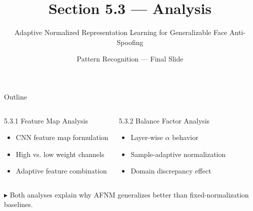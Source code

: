 \documentclass[aspectratio=169,10pt]{beamer}
\author{Pattern Recognition — Final Slide}
\institute{University of Science, VNU HCMC}
\title{Section 5.3 — Analysis}
\subtitle{Adaptive Normalized Representation Learning for Generalizable Face Anti-Spoofing}
\date{}
\newcommand{\pos}[1]{\textcolor{positive}{#1}}
\newcommand{\HL}[1]{\textcolor{emphasis}{#1}}
\begin{document}
\begin{frame}
  \titlepage
\end{frame}

\begin{frame}{Outline}
  \begin{columns}[T]
      \vspace{6pt}
      \begin{block}{5.3.1 Feature Map Analysis}
        \begin{itemize}
          \item CNN feature map formulation
          \item High vs. low weight channels
          \item Adaptive feature combination
        \end{itemize}
      \end{block}
      \vspace{6pt}
      \begin{block}{5.3.2 Balance Factor Analysis}
        \begin{itemize}
          \item Layer-wise $\alpha$ behavior
          \item Sample-adaptive normalization
          \item Domain discrepancy effect
        \end{itemize}
      \end{block}
  \end{columns}
  \vspace{10pt}
  \begin{center}
    \pos{$\blacktriangleright$} Both analyses explain \HL{why} AFNM generalizes better than fixed-normalization baselines.
  \end{center}
\end{frame}
\end{document}
